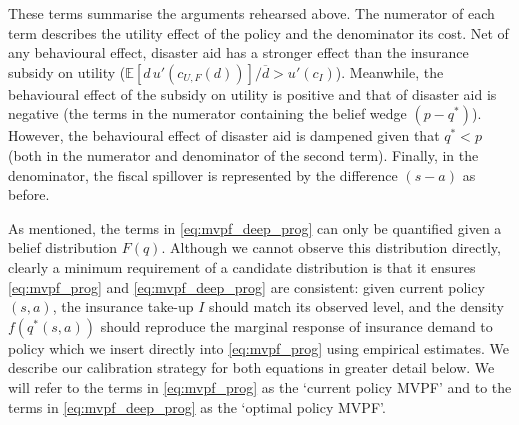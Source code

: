 \documentclass[12pt]{article}
\begin{document}
These terms summarise the arguments rehearsed above. The numerator of each term describes the utility effect of the policy and the denominator its cost. Net of any behavioural effect, disaster aid has a stronger effect than the insurance subsidy on utility ($\mathbb{E}[d\,u'(c_{U,F}(d))]/\overline{d}>u'(c_I)$). Meanwhile, the behavioural effect of the subsidy on utility is positive and that of disaster aid is negative (the terms in the numerator containing the belief wedge $(p-q^*)$). However, the behavioural effect of disaster aid is dampened given that $q^*<p$ (both in the numerator and denominator of the second term). Finally, in the denominator, the fiscal spillover is represented by the difference $(s-a)$ as before. 

As mentioned, the terms in \eqref{eq:mvpf_deep_prog} can only be quantified given a belief distribution $F(q)$. Although we cannot observe this distribution directly, clearly a minimum requirement of a candidate distribution is that it ensures \eqref{eq:mvpf_prog} and \eqref{eq:mvpf_deep_prog} are consistent: given current policy $(s,a)$, the insurance take-up $I$ should match its observed level, and the density $f(q^*(s,a))$ should reproduce the marginal response of insurance demand to policy which we insert directly into \eqref{eq:mvpf_prog} using empirical estimates. We describe our calibration strategy for both equations in greater detail below. We will refer to the terms in \eqref{eq:mvpf_prog} as the `current policy MVPF' and to the terms in \eqref{eq:mvpf_deep_prog} as the `optimal policy MVPF'. 

\end{document}
